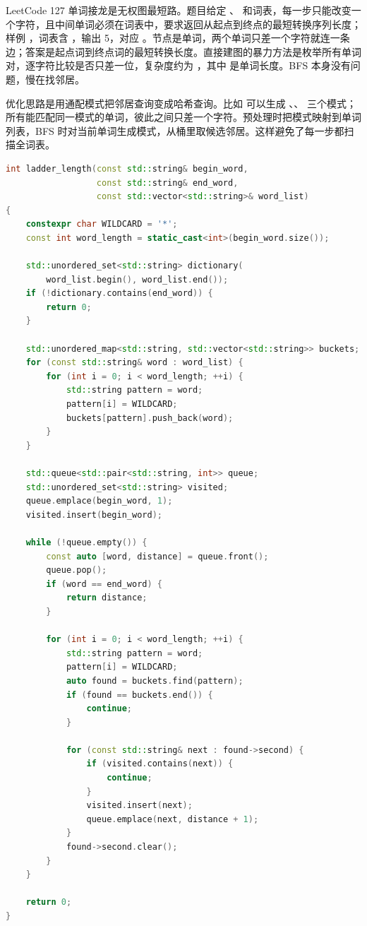 LeetCode 127 单词接龙是无权图最短路。题目给定 、 和词表，每一步只能改变一个字符，且中间单词必须在词表中，要求返回从起点到终点的最短转换序列长度；样例 ，词表含 ，输出 5，对应 。节点是单词，两个单词只差一个字符就连一条边；答案是起点词到终点词的最短转换长度。直接建图的暴力方法是枚举所有单词对，逐字符比较是否只差一位，复杂度约为 ，其中  是单词长度。BFS 本身没有问题，慢在找邻居。

优化思路是用通配模式把邻居查询变成哈希查询。比如  可以生成 、、 三个模式；所有能匹配同一模式的单词，彼此之间只差一个字符。预处理时把模式映射到单词列表，BFS 时对当前单词生成模式，从桶里取候选邻居。这样避免了每一步都扫描全词表。

\begin{lstlisting}[language=C++,caption={LeetCode 127 单词接龙：通配模式加 BFS}]
int ladder_length(const std::string& begin_word,
                  const std::string& end_word,
                  const std::vector<std::string>& word_list)
{
    constexpr char WILDCARD = '*';
    const int word_length = static_cast<int>(begin_word.size());

    std::unordered_set<std::string> dictionary(
        word_list.begin(), word_list.end());
    if (!dictionary.contains(end_word)) {
        return 0;
    }

    std::unordered_map<std::string, std::vector<std::string>> buckets;
    for (const std::string& word : word_list) {
        for (int i = 0; i < word_length; ++i) {
            std::string pattern = word;
            pattern[i] = WILDCARD;
            buckets[pattern].push_back(word);
        }
    }

    std::queue<std::pair<std::string, int>> queue;
    std::unordered_set<std::string> visited;
    queue.emplace(begin_word, 1);
    visited.insert(begin_word);

    while (!queue.empty()) {
        const auto [word, distance] = queue.front();
        queue.pop();
        if (word == end_word) {
            return distance;
        }

        for (int i = 0; i < word_length; ++i) {
            std::string pattern = word;
            pattern[i] = WILDCARD;
            auto found = buckets.find(pattern);
            if (found == buckets.end()) {
                continue;
            }

            for (const std::string& next : found->second) {
                if (visited.contains(next)) {
                    continue;
                }
                visited.insert(next);
                queue.emplace(next, distance + 1);
            }
            found->second.clear();
        }
    }

    return 0;
}
\end{lstlisting}

